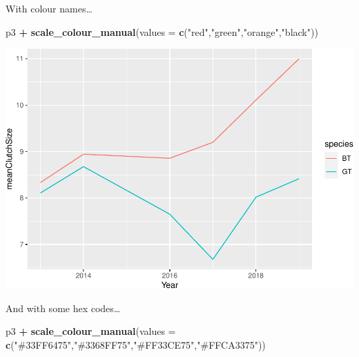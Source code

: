 \documentclass[
  a4paperpaper,
]{book}
\newenvironment{Shaded}{\begin{snugshade}}{\end{snugshade}}
\newcommand{\DataTypeTok}[1]{\textcolor[rgb]{0.13,0.29,0.53}{#1}}
\newcommand{\KeywordTok}[1]{\textcolor[rgb]{0.13,0.29,0.53}{\textbf{#1}}}
\newcommand{\NormalTok}[1]{#1}
\newcommand{\OperatorTok}[1]{\textcolor[rgb]{0.81,0.36,0.00}{\textbf{#1}}}
\newcommand{\StringTok}[1]{\textcolor[rgb]{0.31,0.60,0.02}{#1}}
\begin{document}
With colour names\ldots{}

\begin{Shaded}
\begin{Highlighting}[]
\NormalTok{p3 }\OperatorTok{+}\StringTok{ }
\StringTok{  }\KeywordTok{scale\_colour\_manual}\NormalTok{(}\DataTypeTok{values =} \KeywordTok{c}\NormalTok{(}\StringTok{"red"}\NormalTok{,}\StringTok{"green"}\NormalTok{,}\StringTok{"orange"}\NormalTok{,}\StringTok{"black"}\NormalTok{))}
\end{Highlighting}
\end{Shaded}

\begin{center}\includegraphics{BB852_files/figure-latex/unnamed-chunk-117-1} \end{center}

And with some hex codes\ldots{}

\begin{Shaded}
\begin{Highlighting}[]
\NormalTok{p3 }\OperatorTok{+}\StringTok{ }
\StringTok{  }\KeywordTok{scale\_colour\_manual}\NormalTok{(}\DataTypeTok{values =} \KeywordTok{c}\NormalTok{(}\StringTok{"\#33FF6475"}\NormalTok{,}\StringTok{"\#3368FF75"}\NormalTok{,}\StringTok{"\#FF33CE75"}\NormalTok{,}\StringTok{"\#FFCA3375"}\NormalTok{))}
\end{Highlighting}
\end{Shaded}
\end{document}
